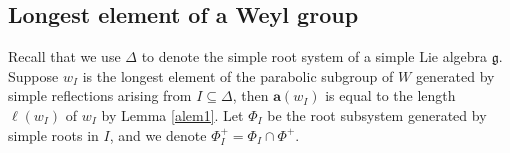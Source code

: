 \documentclass[reqno,12pt]{amsart}
\numberwithin{equation}{section}
\theoremstyle{plain}
\newtheorem{Lem}[Thm]{Lemma}
\theoremstyle{definition}
\newcommand{\msc}[1]{\mathscr{#1}}
\renewcommand{\subset}{\subseteq}
\newcommand{\aff}{ \mathbf{a} }
\newcommand{\gkd}{\operatorname{GKdim}}
\newcommand{\lest}{\leqslant}
\renewcommand{\geq}{\geqslant}
\begin{document}
 
 








\subsection{Longest element of a Weyl group}
Recall that we use $\Delta $ to denote the simple root system of a simple Lie algebra $\mathfrak{g}$. 
Suppose $ w_I $ is the longest element of the parabolic subgroup of $ W $ generated by simple reflections arising from $ I\subset \Delta $, then $ \aff(w_I)$ is equal to  the length $\ell(w_I) $ of $ w_I $ by Lemma \ref{alem1}.
Let $\Phi_{I}$ be the root subsystem 
generated by simple roots in $I$, and we denote $\Phi_{I}^+=\Phi_I \cap \Phi^+ $.
\end{document}
